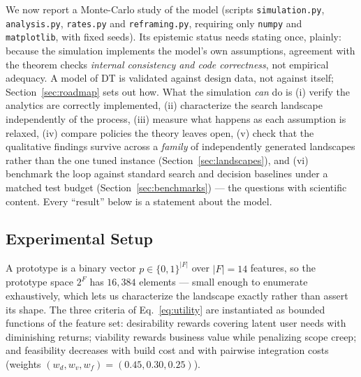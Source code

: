 \documentclass[11pt]{article}
\begin{document}
We now report a Monte-Carlo study of the model (scripts \texttt{simulation.py}, \texttt{analysis.py}, \texttt{rates.py} and \texttt{reframing.py}, requiring only \texttt{numpy} and \texttt{matplotlib}, with fixed seeds). Its epistemic status needs stating once, plainly: because the simulation implements the model's own assumptions, agreement with the theorem checks \emph{internal consistency and code correctness}, not empirical adequacy. A model of DT is validated against design data, not against itself; Section~\ref{sec:roadmap} sets out how. What the simulation \emph{can} do is (i) verify the analytics are correctly implemented, (ii) characterize the search landscape independently of the process, (iii) measure what happens as each assumption is relaxed, (iv) compare policies the theory leaves open, (v) check that the qualitative findings survive across a \emph{family} of independently generated landscapes rather than the one tuned instance (Section~\ref{sec:landscapes}), and (vi) benchmark the loop against standard search and decision baselines under a matched test budget (Section~\ref{sec:benchmarks}) --- the questions with scientific content. Every ``result'' below is a statement about the model.

\subsection{Experimental Setup}
\label{sec:setup}

A prototype is a binary vector $p\in\{0,1\}^{|F|}$ over $|F|=14$ features, so the prototype space $2^F$ has $16{,}384$ elements --- small enough to enumerate exhaustively, which lets us characterize the landscape exactly rather than assert its shape. The three criteria of Eq.~\eqref{eq:utility} are instantiated as bounded functions of the feature set: desirability rewards covering latent user needs with diminishing returns; viability rewards business value while penalizing scope creep; and feasibility decreases with build cost and with pairwise integration costs (weights $(w_d,w_v,w_f)=(0.45,0.30,0.25)$).
\end{document}

